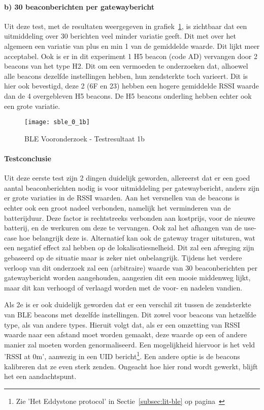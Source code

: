 \paragraph{b) 30 beaconberichten per gatewaybericht}
Uit deze test, met de resultaten weergegeven in grafiek~\ref{fig:ond-ble-1b-res}, is zichtbaar dat een uitmiddeling over 30 berichten veel minder variatie geeft. Dit met over het algemeen een variatie van plus en min 1 van de gemiddelde waarde. Dit lijkt meer acceptabel. Ook is er in dit experiment 1 H5 beacon (code AD) vervangen door 2 beacons van het type H2. Dit om een vermoeden te onderzoeken dat, alhoewel alle beacons dezelfde instellingen hebben, hun zendsterkte toch varieert. Dit is hier ook bevestigd, deze 2 (6F en 23) hebben een hogere gemiddelde RSSI waarde dan de 4 overgebleven H5 beacons. De H5 beacons onderling hebben echter ook een grote variatie.

\begin{figure}[h]
	\texttt{[image: sble\_0\_1b]}
	\caption{BLE Vooronderzoek - Testresultaat 1b}
	\label{fig:ond-ble-1b-res}
\end{figure}

\paragraph{Testconclusie}
Uit deze eerste test zijn 2 dingen duidelijk geworden, allereerst dat er een goed aantal beaconberichten nodig is voor uitmiddeling per gatewaybericht, anders zijn er grote variaties in de RSSI waarden. Aan het versnellen van de beacons is echter ook een groot nadeel verbonden, namelijk het verminderen van de batterijduur. Deze factor is rechtstreeks verbonden aan kostprijs, voor de nieuwe batterij, en de werkuren om deze te vervangen. Ook zal het afhangen van de use-case hoe belangrijk deze is. Alternatief kan ook de gateway trager uitsturen, wat een negatief effect zal hebben op de lokalisatiesnelheid. Dit zal een afweging zijn gebaseerd op de situatie maar is zeker niet onbelangrijk. Tijdens het verdere verloop van dit onderzoek zal een (arbitraire) waarde van 30 beaconberichten per gatewaybericht worden aangehouden, aangezien dit een mooie middenweg lijkt, maar dit kan verhoogd of verlaagd worden met de voor- en nadelen vandien.

Als 2e is er ook duidelijk geworden dat er een verschil zit tussen de zendsterkte van BLE beacons met dezelfde instellingen. Dit zowel voor beacons van hetzelfde type, als van andere types. Hieruit volgt dat, als er een omzetting van RSSI waarde naar een afstand moet worden gemaakt, deze waarde op een of andere manier zal moeten worden genormaliseerd. Een mogelijkheid hiervoor is het veld 'RSSI at 0m', aanwezig in een UID bericht\footnote{Zie 'Het Eddystone protocol' in Sectie~\ref{subsec:lit-ble} op pagina~\pageref{subsec:lit-ble}}. Een andere optie is de beacons kalibreren dat ze even sterk zenden. Ongeacht hoe hier rond wordt gewerkt, blijft het een aandachtspunt.

